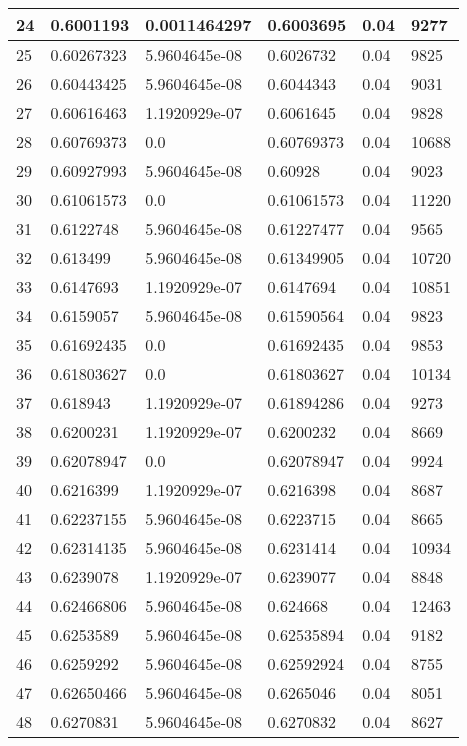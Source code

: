 \begin{longtable}{|l|l|l|l|l|l|}
24 & 0.6001193 & 0.0011464297 & 0.6003695 & 0.04 & 9277 \\ \hline 
25 & 0.60267323 & 5.9604645e-08 & 0.6026732 & 0.04 & 9825 \\ \hline 
26 & 0.60443425 & 5.9604645e-08 & 0.6044343 & 0.04 & 9031 \\ \hline 
27 & 0.60616463 & 1.1920929e-07 & 0.6061645 & 0.04 & 9828 \\ \hline 
28 & 0.60769373 & 0.0 & 0.60769373 & 0.04 & 10688 \\ \hline 
29 & 0.60927993 & 5.9604645e-08 & 0.60928 & 0.04 & 9023 \\ \hline 
30 & 0.61061573 & 0.0 & 0.61061573 & 0.04 & 11220 \\ \hline 
31 & 0.6122748 & 5.9604645e-08 & 0.61227477 & 0.04 & 9565 \\ \hline 
32 & 0.613499 & 5.9604645e-08 & 0.61349905 & 0.04 & 10720 \\ \hline 
33 & 0.6147693 & 1.1920929e-07 & 0.6147694 & 0.04 & 10851 \\ \hline 
34 & 0.6159057 & 5.9604645e-08 & 0.61590564 & 0.04 & 9823 \\ \hline 
35 & 0.61692435 & 0.0 & 0.61692435 & 0.04 & 9853 \\ \hline 
36 & 0.61803627 & 0.0 & 0.61803627 & 0.04 & 10134 \\ \hline 
37 & 0.618943 & 1.1920929e-07 & 0.61894286 & 0.04 & 9273 \\ \hline 
38 & 0.6200231 & 1.1920929e-07 & 0.6200232 & 0.04 & 8669 \\ \hline 
39 & 0.62078947 & 0.0 & 0.62078947 & 0.04 & 9924 \\ \hline 
40 & 0.6216399 & 1.1920929e-07 & 0.6216398 & 0.04 & 8687 \\ \hline 
41 & 0.62237155 & 5.9604645e-08 & 0.6223715 & 0.04 & 8665 \\ \hline 
42 & 0.62314135 & 5.9604645e-08 & 0.6231414 & 0.04 & 10934 \\ \hline 
43 & 0.6239078 & 1.1920929e-07 & 0.6239077 & 0.04 & 8848 \\ \hline 
44 & 0.62466806 & 5.9604645e-08 & 0.624668 & 0.04 & 12463 \\ \hline 
45 & 0.6253589 & 5.9604645e-08 & 0.62535894 & 0.04 & 9182 \\ \hline 
46 & 0.6259292 & 5.9604645e-08 & 0.62592924 & 0.04 & 8755 \\ \hline 
47 & 0.62650466 & 5.9604645e-08 & 0.6265046 & 0.04 & 8051 \\ \hline 
48 & 0.6270831 & 5.9604645e-08 & 0.6270832 & 0.04 & 8627 \\ \hline 

\end{longtable}
